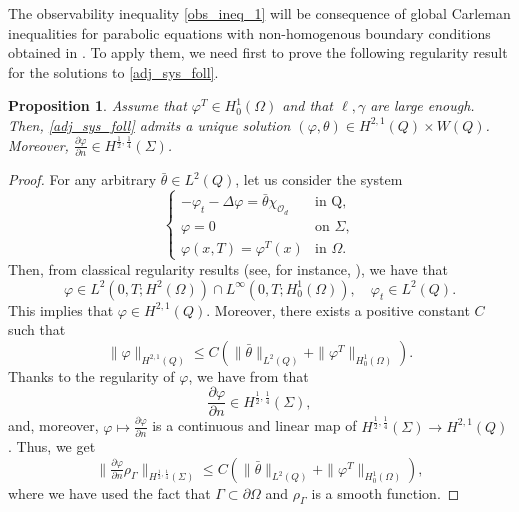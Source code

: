 \documentclass{aims}
\newtheorem{proposition}{Proposition}
\theoremstyle{definition}
\def\csbd{\rho_{\Gamma}}
\begin{document}
The observability inequality \eqref{obs_ineq_1} will be consequence of global Carleman inequalities for parabolic equations with non-homogenous boundary conditions obtained in \cite{ima_yama_boundary}. To apply them, we need first to prove the following regularity result for the solutions to \eqref{adj_sys_foll}.

\begin{proposition}\label{prof_regularity}
Assume that $\varphi^T\in H_0^1(\Omega)$ and that $\ell,\gamma$ are large enough. Then, \eqref{adj_sys_foll} admits a unique solution $(\varphi,\theta)\in H^{2,1}(Q)\times W(Q)$. Moreover, $\frac{\partial \varphi}{\partial n}\in H^{\frac12,\frac14}(\Sigma)$. 
\end{proposition}
%
\begin{proof}
For any arbitrary $\bar \theta\in L^2(Q)$, let us consider the system
%
\begin{equation}\label{heat_fixed}
\begin{cases}
-\varphi_t-\Delta \varphi=\bar\theta\chi_{\mathcal O_d} & \text{in Q}, \\
\varphi=0 &\text{on } \Sigma, \\
\varphi(x,T)=\varphi^T(x) & \text{in } \Omega.
\end{cases}
\end{equation}
%
Then, from classical regularity results (see, for instance, \cite{evans}), we have that 
%
\begin{equation*}
\varphi\in L^2(0,T;H^2(\Omega))\cap L^\infty(0,T;H_0^1(\Omega)), \quad \varphi_t\in L^2(Q).
\end{equation*}
%
This implies that $\varphi\in H^{2,1}(Q)$. Moreover, there exists a positive constant $C$ such that
%
\begin{equation}\label{norm_varphi_h21}
\|\varphi\|_{H^{2,1}(Q)}\leq C\left(\|\bar \theta\|_{L^2(Q)}+\|\varphi^T\|_{H_{0}^{1}(\Omega)} \right).
\end{equation}
%
Thanks to the regularity of $\varphi$, we have from \cite[Th. 2.1, p.9]{lions_magenes} that 
%
\begin{equation*}
\frac{\partial\varphi}{\partial n}\in H^{\frac12,\frac14}(\Sigma),
\end{equation*}
%
and, moreover,  $\varphi \mapsto \frac{\partial \varphi }{\partial n}$ is a continuous and linear map of $H^{\frac12,\frac14}(\Sigma)\to H^{2,1}(Q)$. Thus, we get
%
\begin{equation}\label{est_phi_h1214}
\|\tfrac{\partial \varphi}{\partial n}\csbd\|_{H^{\frac12,\frac14}(\Sigma)}\leq C\left(\|\bar \theta\|_{L^2(Q)}+\|\varphi^T\|_{H_{0}^{1}(\Omega)} \right),
\end{equation}
%
where we have used the fact that $\Gamma\subset \partial \Omega$ and $\csbd$ is a smooth function. 


\end{proof}
\end{document}
